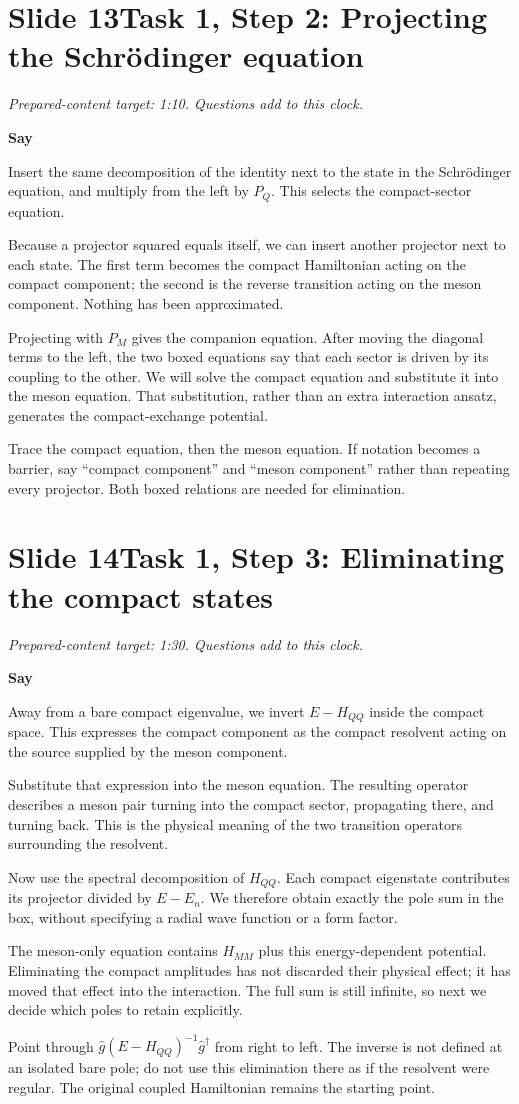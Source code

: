 \documentclass[11pt,a4paper]{article}
\newcommand{\cue}[1]{\begin{private}#1\end{private}}
\newenvironment{speech}{\par\textbf{Say}\par}{\par}
\newcommand{\slidenote}[3]{%
  \clearpage
  \pdfbookmark[1]{Slide #1}{slide-#1}%
  \section*{Slide #1\quad #2}
  \textit{Prepared-content target: #3. Questions add to this clock.}\par
}
\begin{document}
\slidenote{13}{Task 1, Step 2: Projecting the Schr\"odinger equation}{1:10}
\begin{speech}
Insert the same decomposition of the identity next to the state in
the Schr\"odinger equation, and multiply from the left by $P_Q$.
This selects the compact-sector equation.

Because a projector squared equals itself, we can insert another
projector next to each state. The first term becomes the compact
Hamiltonian acting on the compact component; the second is the reverse
transition acting on the meson component. Nothing has been approximated.

Projecting with $P_M$ gives the companion equation. After moving the
diagonal terms to the left, the two boxed equations say that each
sector is driven by its coupling to the other. We will solve the
compact equation and substitute it into the meson equation. That
substitution, rather than an extra interaction ansatz, generates the
compact-exchange potential.
\end{speech}
\cue{Trace the compact equation, then the meson equation. If notation becomes
a barrier, say ``compact component'' and ``meson component'' rather than
repeating every projector. Both boxed relations are needed for elimination.}

\slidenote{14}{Task 1, Step 3: Eliminating the compact states}{1:30}
\begin{speech}
Away from a bare compact eigenvalue, we invert $E-H_{QQ}$ inside the
compact space. This expresses the compact component as the compact
resolvent acting on the source supplied by the meson component.

Substitute that expression into the meson equation. The resulting
operator describes a meson pair turning into the compact sector,
propagating there, and turning back. This is the physical meaning
of the two transition operators surrounding the resolvent.

Now use the spectral decomposition of $H_{QQ}$. Each compact eigenstate
contributes its projector divided by $E-E_n$. We therefore obtain
exactly the pole sum in the box, without specifying a radial wave
function or a form factor.

The meson-only equation contains $H_{MM}$ plus this energy-dependent
potential. Eliminating the compact amplitudes has not discarded their
physical effect; it has moved that effect into the interaction.
The full sum is still infinite, so next we decide which poles to retain
explicitly.
\end{speech}
\cue{Point through $\hat g(E-H_{QQ})^{-1}\hat g^\dagger$ from right to left.
The inverse is not defined at an isolated bare pole; do not use this
elimination there as if the resolvent were regular. The original coupled
Hamiltonian remains the starting point.}
\end{document}
